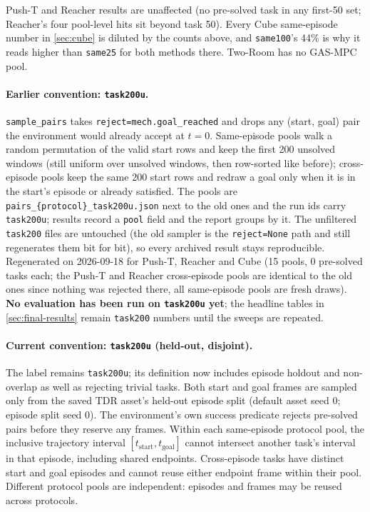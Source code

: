 \documentclass[11pt]{article}
\begin{document}
\noindent Push-T and Reacher results are unaffected (no pre-solved task in any first-50 set;
Reacher's four pool-level hits sit beyond task 50). Every Cube same-episode number in
\cref{sec:cube} is diluted by the counts above, and \texttt{same100}'s 44\% is why it reads
higher than \texttt{same25} for both methods there. Two-Room has no GAS-MPC pool.

\paragraph{Earlier convention: \texttt{task200u}.} \texttt{sample\_pairs} takes
\texttt{reject=mech.goal\_reached} and drops any (start, goal) pair the environment would
already accept at $t=0$. Same-episode pools walk a random permutation of the valid start
rows and keep the first 200 unsolved windows (still uniform over unsolved windows, then
row-sorted like before); cross-episode pools keep the same 200 start rows and redraw a goal
only when it is in the start's episode or already satisfied. The pools are
\texttt{pairs\_\{protocol\}\_task200u.json} next to the old ones and the run ids carry
\texttt{task200u}; results record a \texttt{pool} field and the report groups by it. The
unfiltered \texttt{task200} files are untouched (the old sampler is the \texttt{reject=None}
path and still regenerates them bit for bit), so every archived result stays reproducible.
Regenerated on 2026-09-18 for Push-T, Reacher and Cube (15 pools, 0 pre-solved tasks each;
the Push-T and Reacher cross-episode pools are identical to the old ones since nothing was
rejected there, all same-episode pools are fresh draws). \textbf{No evaluation has been run
on \texttt{task200u} yet}; the headline tables in \cref{sec:final-results} remain
\texttt{task200} numbers until the sweeps are repeated.

\paragraph{Current convention: \texttt{task200u} (held-out, disjoint).}
The label remains \texttt{task200u}; its definition now includes episode holdout and
non-overlap as well as rejecting trivial tasks. Both start and goal frames are sampled
only from the saved TDR asset's held-out episode split (default asset seed 0; episode
split seed 0). The environment's own success predicate rejects pre-solved pairs before
they reserve any frames. Within each same-episode protocol pool, the inclusive trajectory
interval $[t_{\mathrm{start}},t_{\mathrm{goal}}]$ cannot intersect another task's interval
in that episode, including shared endpoints. Cross-episode tasks have distinct start and
goal episodes and cannot reuse either endpoint frame within their pool. Different protocol
pools are independent: episodes and frames may be reused across protocols.
\end{document}
